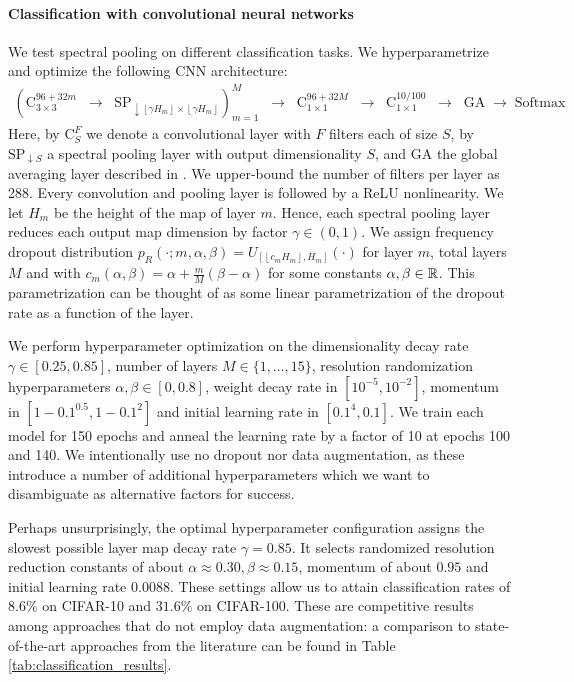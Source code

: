 \documentclass{article} %
\begin{document}
\paragraph{Classification with convolutional neural networks} We test spectral pooling on different classification tasks. We hyperparametrize and optimize the following CNN architecture:
\begin{align}
\left(\textrm{C}^{96 + 32m}_{3\times 3}\;\;\rightarrow\;\; \textrm{SP}_{\downarrow\left \lfloor{\gamma H_m}\right \rfloor\times \left \lfloor{\gamma H_m}\right \rfloor} \right)_{m=1}^M \;\;\rightarrow\;\; \textrm{C}^{96 + 32M}_{1\times 1} \;\;\rightarrow\;\; \textrm{C}^{10/100}_{1\times 1} \;\;\rightarrow\;\; \textrm{GA} \;\rightarrow\; \textrm{Softmax}
\label{eqn:cnn_sp}
\end{align}
Here, by $\textrm{C}^F_S$ we denote a convolutional layer with $F$ filters each of size $S$, by $\textrm{SP}_{\downarrow S}$ a spectral pooling layer with output dimensionality $S$, and $\textrm{GA}$ the global averaging layer described in \citet{journals/corr/LinCY13}. We upper-bound the number of filters per layer as 288. Every convolution and pooling layer is followed by a ReLU nonlinearity. We let $H_m$ be the height of the map of layer $m$. Hence, each spectral pooling layer reduces each output map dimension by factor ${\gamma\in(0, 1)}$. We assign frequency dropout distribution $p_R(\cdot; m, \alpha, \beta)=U_{[\left \lfloor{c_mH_m}\right \rfloor, H_m]}(\cdot)$ for layer $m$, total layers $M$ and with $c_m(\alpha, \beta)=\alpha + \frac{m}{M}(\beta - \alpha)$ for some constants $\alpha, \beta\in\mathbb{R}$. This parametrization can be thought of as some linear parametrization of the dropout rate as a function of the layer.

We perform hyperparameter optimization on the dimensionality decay rate ${\gamma\in[0.25, 0.85]}$, number of layers ${M\in\{1, \ldots, 15\}}$, resolution randomization hyperparameters ${\alpha,\beta\in[0, 0.8]}$, weight decay rate in $[10^{-5}, 10^{-2}]$, momentum in $[1 - 0.1^{0.5}, 1 - 0.1^2]$ and initial learning rate in $[0.1^4, 0.1]$. We train each model for 150 epochs and anneal the learning rate by a factor of 10 at epochs 100 and 140. We intentionally use no dropout nor data augmentation, as these introduce a number of additional hyperparameters which we want to disambiguate as alternative factors for success.

Perhaps unsurprisingly, the optimal hyperparameter configuration assigns the slowest possible layer map decay rate ${\gamma = 0.85}$. It selects randomized resolution reduction constants of about ${\alpha\approx 0.30, \beta\approx 0.15}$, momentum of about $0.95$ and initial learning rate $0.0088$. These settings allow us to attain classification rates of $8.6\%$ on CIFAR-10 and $31.6\%$ on CIFAR-100. These are competitive results among approaches that do not employ data augmentation: a comparison to state-of-the-art approaches from the literature can be found in Table \ref{tab:classification_results}.
\end{document}

